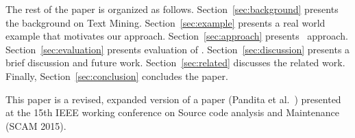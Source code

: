 The rest of the paper is organized as follows.
Section~\ref{sec:background} presents the background on Text Mining.
Section~\ref{sec:example} presents a real world example that motivates our approach. Section~\ref{sec:approach} presents \tool\ approach.
Section~\ref{sec:evaluation} presents evaluation of \tool.
Section~\ref{sec:discussion} presents a brief discussion and future work.
Section~\ref{sec:related} discusses the related work.
Finally, Section~\ref{sec:conclusion} concludes the paper.


\begin{framed}
This paper is a revised, expanded version of a paper (Pandita et al.~\cite{pandita2015discovering}) presented at the 15th
IEEE working conference on Source code analysis and Maintenance (SCAM 2015).
\end{framed}


